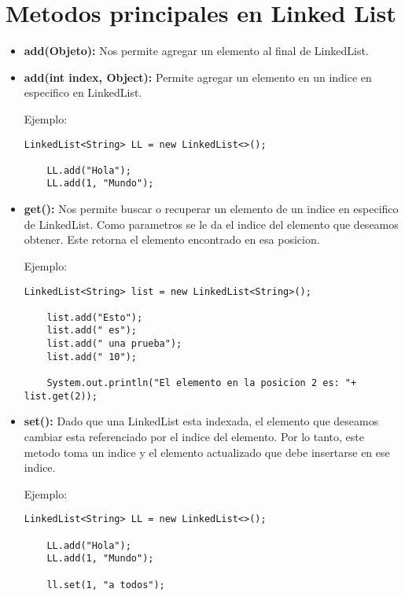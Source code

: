\documentclass[12pt, letterpaper]{article} %
\begin{document}
\section*{Metodos principales en Linked List}
\begin{itemize}
    \item \textbf{add(Objeto):} Nos permite agregar un elemento al final de LinkedList.
    
    \item \textbf{add(int index, Object):} Permite agregar un elemento en un indice en especifico en LinkedList.
    
    \lstset{language = Java, breaklines=true, basicstyle=\footnotesize}
    Ejemplo:
    \begin{lstlisting}[frame=single]
    LinkedList<String> LL = new LinkedList<>();

    LL.add("Hola");  
    LL.add(1, "Mundo");
    \end{lstlisting}
    
    \item \textbf{get():} Nos permite buscar o recuperar un elemento de un indice en especifico de LinkedList. Como parametros se le da el indice del elemento que deseamos obtener. Este retorna el elemento encontrado en esa posicion.
    
    Ejemplo:
    \lstset{language = Java, breaklines=true, basicstyle=\footnotesize}
    \begin{lstlisting}[frame=single]
    LinkedList<String> list = new LinkedList<String>();

    list.add("Esto");
    list.add(" es");
    list.add(" una prueba");
    list.add(" 10");

    System.out.println("El elemento en la posicion 2 es: "+ list.get(2));
    \end{lstlisting}
    
    \item \textbf{set():} Dado que una LinkedList esta indexada, el elemento que deseamos cambiar esta referenciado por el indice del elemento. Por lo tanto, este metodo toma un indice y el elemento actualizado que debe insertarse en ese indice.

    Ejemplo:
    \lstset{language = Java, breaklines=true, basicstyle=\footnotesize}
    \begin{lstlisting}[frame=single]
    LinkedList<String> LL = new LinkedList<>();

    LL.add("Hola");  
    LL.add(1, "Mundo");

    ll.set(1, "a todos");
    \end{lstlisting}
    

\end{itemize}
\end{document}
